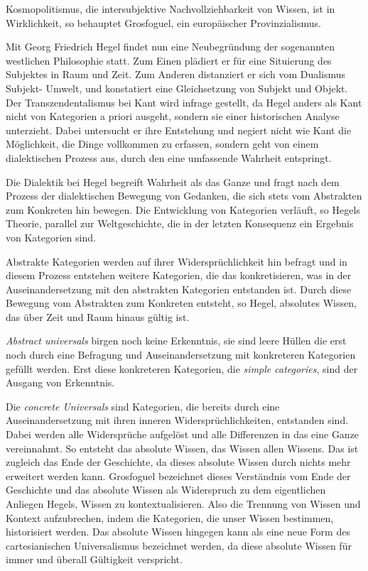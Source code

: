 Kosmopolitismus, die intersubjektive
Nachvollziehbarkeit von Wissen, ist in Wirklichkeit, so behauptet Grosfoguel,
ein europäischer Provinzialismus.

Mit Georg Friedrich Hegel findet nun eine Neubegründung der sogenannten
westlichen Philosophie statt. Zum Einen plädiert er für eine Situierung des
Subjektes in Raum und Zeit.\footnotemark {}
 Zum Anderen distanziert er sich vom Dualismus
Subjekt- Umwelt, und konstatiert eine Gleichsetzung von Subjekt und Objekt. Der
Transzendentalismus bei Kant wird infrage gestellt, da Hegel anders als Kant
nicht von Kategorien a priori ausgeht, sondern sie einer historischen Analyse
unterzieht. Dabei untersucht er ihre Entstehung und negiert nicht wie Kant die
Möglichkeit, die Dinge vollkommen zu erfassen, sondern geht von einem
dialektischen Prozess aus, durch den eine umfassende Wahrheit entspringt.\footnotemark {}
 
Die Dialektik bei Hegel begreift Wahrheit als das Ganze und fragt nach dem
Prozess der dialektischen Bewegung von Gedanken, die sich stets vom Abstrakten
zum Konkreten hin bewegen. Die Entwicklung von Kategorien verläuft, so Hegels
Theorie, parallel zur Weltgeschichte, die in der letzten Konsequenz ein
Ergebnis von Kategorien sind.\footnotemark {}

Abstrakte Kategorien werden auf ihrer Widersprüchlichkeit hin befragt und in
diesem Prozess entstehen weitere Kategorien, die das konkretisieren, was in der
Auseinandersetzung mit den abstrakten Kategorien entstanden ist. Durch diese
Bewegung vom Abstrakten zum Konkreten entsteht, so Hegel, absolutes Wissen, das
über Zeit und Raum hinaus gültig ist.

\textit{Abstract universals} birgen noch keine
Erkenntnis, sie sind leere Hüllen die erst noch durch eine Befragung und
Auseinandersetzung mit konkreteren Kategorien gefüllt werden. Erst diese
konkreteren Kategorien, die \textit{simple categories}, sind der Ausgang von
Erkenntnis. \footnotemark {}

Die \textit{concrete Universals} sind Kategorien, die bereits durch eine
Auseinandersetzung mit ihren inneren Widersprüchlichkeiten, entstanden
sind.\footnotemark {} Dabei werden alle Widersprüche aufgelöst und alle Differenzen in das eine
Ganze vereinnahmt. So entsteht das absolute Wissen, das Wissen allen
Wissens.\footnotemark {} Das ist zugleich das Ende der Geschichte, da dieses absolute Wissen
durch nichts mehr erweitert werden kann. Grosfoguel bezeichnet dieses
Verständnis vom Ende der Geschichte und das absolute Wissen als Widerspruch zu
dem eigentlichen Anliegen Hegels, Wissen zu kontextualisieren. Also die
Trennung von Wissen und Kontext aufzubrechen, indem die Kategorien, die unser
Wissen bestimmen, historisiert werden. Das absolute Wissen hingegen kann als
eine neue Form des cartesianischen Universalismus bezeichnet werden, da diese
absolute Wissen für immer und überall Gültigkeit verspricht.

